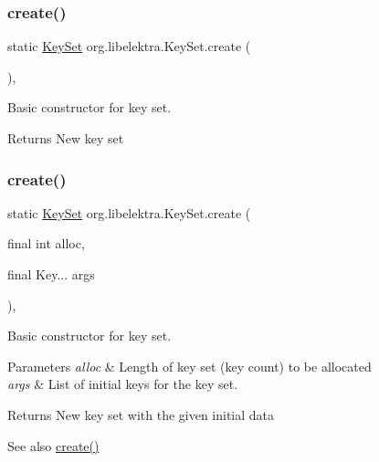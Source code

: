 \subsubsection{\texorpdfstring{create()}{create()}\hspace{0.1cm}{\footnotesize\ttfamily [2/3]}}
{\footnotesize\ttfamily static \hyperlink{classorg_1_1libelektra_1_1KeySet}{Key\+Set} org.\+libelektra.\+Key\+Set.\+create (\begin{DoxyParamCaption}{ }\end{DoxyParamCaption})\hspace{0.3cm}{\ttfamily [inline]}, {\ttfamily [static]}}



Basic constructor for key set. 

\begin{DoxyReturn}{Returns}
New key set 
\end{DoxyReturn}
\mbox{\label{classorg_1_1libelektra_1_1KeySet_a441d0e45a150a6fd5f75be00ec42338d}} 
\subsubsection{\texorpdfstring{create()}{create()}\hspace{0.1cm}{\footnotesize\ttfamily [3/3]}}
{\footnotesize\ttfamily static \hyperlink{classorg_1_1libelektra_1_1KeySet}{Key\+Set} org.\+libelektra.\+Key\+Set.\+create (\begin{DoxyParamCaption}\item[{final int}]{alloc,  }\item[{final Key...}]{args }\end{DoxyParamCaption})\hspace{0.3cm}{\ttfamily [inline]}, {\ttfamily [static]}}



Basic constructor for key set. 


\begin{DoxyParams}{Parameters}
{\em alloc} & Length of key set (key count) to be allocated \\
\hline
{\em args} & List of initial keys for the key set. \\
\hline
\end{DoxyParams}
\begin{DoxyReturn}{Returns}
New key set with the given initial data 
\end{DoxyReturn}
\begin{DoxySeeAlso}{See also}
\hyperlink{classorg_1_1libelektra_1_1KeySet_ac0ba4b88bef5e731b586f4ca63b9ab7f}{create()} 
\end{DoxySeeAlso}
\mbox{\label{classorg_1_1libelektra_1_1KeySet_a684ac5513b51d841cc04bdcdb203c4cf}} 
